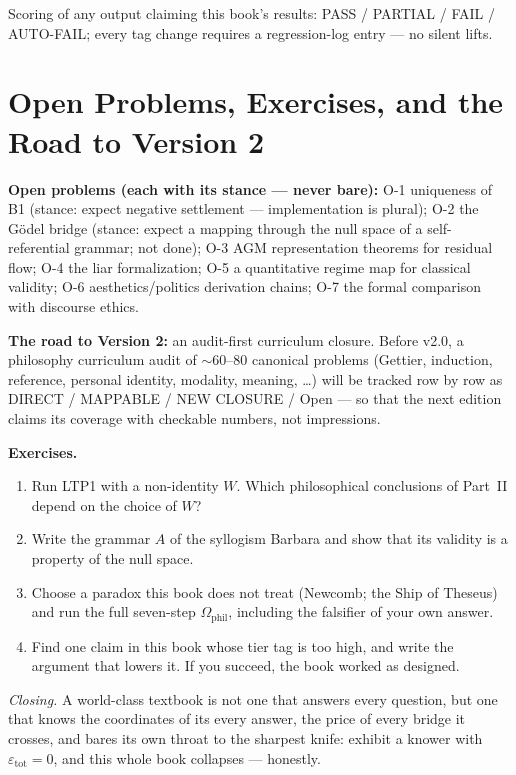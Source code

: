 \documentclass[11pt,a4paper,twoside]{book}
\theoremstyle{plain}
\theoremstyle{definition}
\theoremstyle{remark}
\begin{document}
Scoring of any output claiming this book's results: PASS / PARTIAL / FAIL /
AUTO-FAIL; every tag change requires a regression-log entry --- no silent
lifts.

\chapter{Open Problems, Exercises, and the Road to Version 2}

\textbf{Open problems (each with its stance --- never bare):}
O-1 uniqueness of B1 (stance: expect negative settlement --- implementation
is plural); O-2 the G\"odel bridge (stance: expect a mapping through the null
space of a self-referential grammar; not done); O-3 AGM representation
theorems for residual flow; O-4 the liar formalization; O-5 a quantitative
regime map for classical validity; O-6 aesthetics/politics derivation
chains; O-7 the formal comparison with discourse ethics.

\textbf{The road to Version 2:} an audit-first curriculum closure. Before
v2.0, a philosophy curriculum audit of $\sim$60--80 canonical problems
(Gettier, induction, reference, personal identity, modality, meaning,
\dots) will be tracked row by row as DIRECT / MAPPABLE / NEW CLOSURE / Open
--- so that the next edition claims its coverage with checkable numbers, not
impressions.

\textbf{Exercises.}
\begin{enumerate}
\item Run LTP1 with a non-identity $W$. Which philosophical conclusions of
  Part~II depend on the choice of $W$?
\item Write the grammar $A$ of the syllogism Barbara and show that its
  validity is a property of the null space.
\item Choose a paradox this book does not treat (Newcomb; the Ship of
  Theseus) and run the full seven-step $\Omega_{\mathrm{phil}}$, including
  the falsifier of your own answer.
\item Find one claim in this book whose tier tag is too high, and write the
  argument that lowers it. If you succeed, the book worked as designed.
\end{enumerate}

\vspace{1em}
\noindent\emph{Closing.} A world-class textbook is not one that answers every
question, but one that knows the coordinates of its every answer, the price
of every bridge it crosses, and bares its own throat to the sharpest knife:
exhibit a knower with $\varepsilon_{\mathrm{tot}}=0$, and this whole book
collapses --- honestly.
\end{document}
